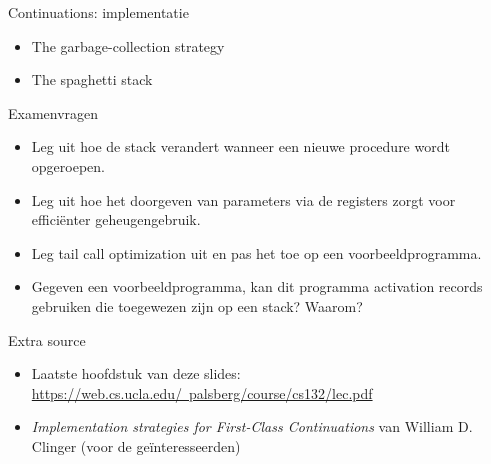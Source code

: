 \documentclass{beamer}
\begin{document}
\begin{frame}{Continuations: implementatie}
\begin{itemize}
    \item The garbage-collection strategy
    \item The spaghetti stack
\end{itemize}
\end{frame}

\begin{frame}{Examenvragen}
    \begin{itemize}
        \item Leg uit hoe de stack verandert wanneer een nieuwe procedure wordt opgeroepen.
        \item Leg uit hoe het doorgeven van parameters via de registers zorgt voor efficiënter geheugengebruik.
        \item Leg tail call optimization uit en pas het toe op een voorbeeldprogramma.
        \item Gegeven een voorbeeldprogramma, kan dit programma activation records gebruiken die toegewezen zijn op een stack? Waarom?
    \end{itemize}
\end{frame}

\begin{frame}{Extra source}
\begin{itemize}
    \item Laatste hoofdstuk van deze slides: \href{https://web.cs.ucla.edu/~palsberg/course/cs132/lec.pdf}{https://web.cs.ucla.edu/~palsberg/course/cs132/lec.pdf}
    \item \emph{Implementation strategies for First-Class Continuations} van William D. Clinger (voor de geïnteresseerden)
\end{itemize}
\end{frame}
\end{document}
